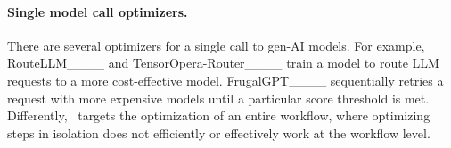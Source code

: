 \paragraph{Single model call optimizers.} There are several optimizers for a single call to gen-AI models. For example, RouteLLM____ and TensorOpera-Router____ train a model to route LLM requests to a more cost-effective model. %
FrugalGPT____ sequentially retries a request with more expensive models until a particular score threshold is met. 
Differently, \sysname\ targets the optimization of an entire workflow, where optimizing steps in isolation does not efficiently or effectively work at the workflow level.
